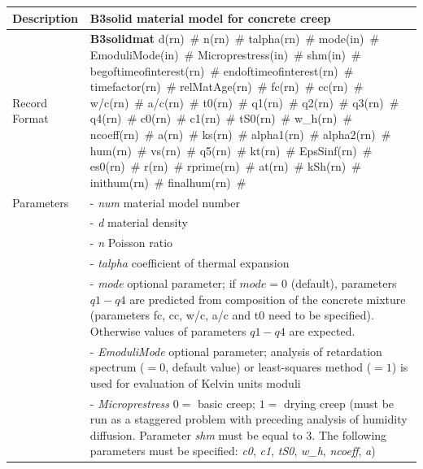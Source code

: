 \documentclass[a4paper]{article}
\newcommand{\descitem}[1]{{\noindent \bf #1}}
\newcommand{\elemparam}[2]{{{#1\tiny (#2)}~\#}}
\newcommand{\param}[1]{{\it #1}}
\begin{document}
\begin{table}[!htb]
\begin{tabular}{|l|p{9cm}|}
\hline
Description & B3solid material model  for concrete creep\\
\hline
Record Format & \descitem{B3solidmat} 
\elemparam{d}{rn} \elemparam{n}{rn} \elemparam{talpha}{rn}
%
\elemparam{mode}{in} 
\elemparam{EmoduliMode}{in} 
\elemparam{Microprestress}{in}
\elemparam{shm}{in} 
\elemparam{begoftimeofinterest}{rn} \elemparam{endoftimeofinterest}{rn} \elemparam{timefactor}{rn} \elemparam{relMatAge}{rn}
\elemparam{fc}{rn} \elemparam{cc}{rn} \elemparam{w/c}{rn} \elemparam{a/c}{rn} \elemparam{t0}{rn} %
\elemparam{q1}{rn} \elemparam{q2}{rn} \elemparam{q3}{rn} \elemparam{q4}{rn} %
%
\elemparam{c0}{rn} \elemparam{c1}{rn} \elemparam{tS0}{rn} %
\elemparam{w\_h}{rn} \elemparam{ncoeff}{rn} \elemparam{a}{rn}
%
\elemparam{ks}{rn} 
\elemparam{alpha1}{rn} \elemparam{alpha2}{rn} \elemparam{hum}{rn} \elemparam{vs}{rn}
\elemparam{q5}{rn} \elemparam{kt}{rn} \elemparam{EpsSinf}{rn}
\elemparam{es0}{rn} \elemparam{r}{rn} \elemparam{rprime}{rn} \elemparam{at}{rn}     
\elemparam{kSh}{rn}
\elemparam{inithum}{rn} \elemparam{finalhum}{rn}\\
%	   	  
Parameters 
&- \param{num} material model number\\
&- \param{d} material density\\
&- \param{n} Poisson ratio\\
&- \param{talpha} coefficient of thermal expansion\\

&- \param{mode} optional parameter; if $mode = 0$ (default),  parameters $q1-q4$ are predicted from composition of the concrete mixture (parameters fc, cc, w/c, a/c and t0 need to be specified). Otherwise values of parameters $q1-q4$ are expected.\\
&- \param{EmoduliMode} optional parameter; analysis of retardation spectrum ($=0$, default value) or least-squares method ($=1$) is used for evaluation of Kelvin units moduli\\
&- \param{Microprestress} $0=$ basic creep; $1=$ drying creep (must be run as a staggered problem with preceding analysis of humidity diffusion. Parameter \param{shm} must be equal to 3. The following parameters must be specified: \param{c0}, \param{c1}, \param{tS0}, \param{w\_h}, \param{ncoeff}, \param{a})\\


\end{tabular}
\end{table}
\end{document}
